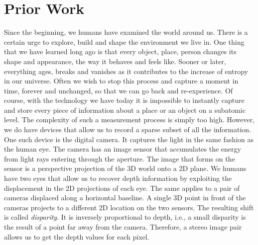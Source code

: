 \chapter{Prior Work}
	
	Since the beginning, we humans have examined the world around us. 
	There is a certain urge to explore, build and shape the environment we live in.
	One thing that we have learned long ago is that every object, place, person changes its shape and appearance, the way it behaves and feels like. Sooner or later, everything ages, breaks and vanishes as it contributes to the increase of entropy in our universe.
	Often we wish to stop this process and capture a moment in time, forever and unchanged, so that we can go back and re-experience.
	Of course, with the technology we have today it is impossible to instantly capture and store every piece of information about a place or an object on a subatomic level.
	The complexity of such a measurement process is simply too high.
	However, we do have devices that allow us to record a sparse subset of all the information.
	One such device is the digital camera.
	It captures the light in the same fashion as the human eye.
	The camera has an image sensor that accumulates the energy from light rays entering through the aperture.
	The image that forms on the sensor is a perspective projection of the 3D world onto a 2D plane.
	We humans have two eyes that allow us to recover depth information by exploiting the displacement in the 2D projections of each eye.
	The same applies to a pair of cameras displaced along a horizontal baseline.
	A single 3D point in front of the cameras projects to a different 2D location on the two sensors.
	The resulting shift is called \emph{disparity}.
	It is inversely proportional to depth, i.e., a small disparity is the result of a point far away from the camera.
	Therefore, a stereo image pair allows us to get the depth values for each pixel.
	
